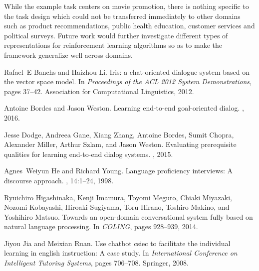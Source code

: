 \documentclass[11pt]{article}
\begin{document}
While the example task centers on movie promotion, there is nothing specific to the task design which could not be transferred immediately to other domains such as product recommendations, public health education, customer services and political surveys. Future work would further investigate different types of representations for reinforcement learning algorithms so as to make the framework generalize well across domains.



\begin{thebibliography}{}

Rafael~E Banchs and Haizhou Li.
\newblock Iris: a chat-oriented dialogue system based on the vector space
  model.
\newblock In {\em Proceedings of the ACL 2012 System Demonstrations}, pages
  37--42. Association for Computational Linguistics, 2012.

Antoine Bordes and Jason Weston.
\newblock Learning end-to-end goal-oriented dialog.
, 2016.

Jesse Dodge, Andreea Gane, Xiang Zhang, Antoine Bordes, Sumit Chopra, Alexander
  Miller, Arthur Szlam, and Jason Weston.
\newblock Evaluating prerequisite qualities for learning end-to-end dialog
  systems.
, 2015.

Agnes~Weiyun He and Richard Young.
\newblock Language proficiency interviews: A discourse approach.
, 14:1--24, 1998.

Ryuichiro Higashinaka, Kenji Imamura, Toyomi Meguro, Chiaki Miyazaki, Nozomi
  Kobayashi, Hiroaki Sugiyama, Toru Hirano, Toshiro Makino, and Yoshihiro
  Matsuo.
\newblock Towards an open-domain conversational system fully based on natural
  language processing.
\newblock In {\em COLING}, pages 928--939, 2014.

Jiyou Jia and Meixian Ruan.
\newblock Use chatbot csiec to facilitate the individual learning in english
  instruction: A case study.
\newblock In {\em International Conference on Intelligent Tutoring Systems},
  pages 706--708. Springer, 2008.


\end{thebibliography}
\end{document}
